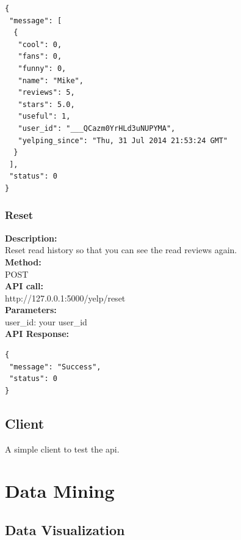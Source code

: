 \documentclass[12pt]{article}
\begin{document}
\begin{singlespacing}
\begin{lstlisting}
{
 "message": [
  {
   "cool": 0,
   "fans": 0,
   "funny": 0,
   "name": "Mike",
   "reviews": 5,
   "stars": 5.0,
   "useful": 1,
   "user_id": "___QCazm0YrHLd3uNUPYMA",
   "yelping_since": "Thu, 31 Jul 2014 21:53:24 GMT"
  }
 ],
 "status": 0
}
\end{lstlisting}
\end{singlespacing}

\subsubsection{Reset}
\textbf{Description:}\\
Reset read history so that you can see the read reviews again.\\
\textbf{Method:}\\
POST\\
\textbf{API call:}\\ 
http://127.0.0.1:5000/yelp/reset\\
\textbf{Parameters:}\\
user\_id: your user\_id\\
\textbf{API Response:}

\begin{singlespacing}
\begin{lstlisting}
{
 "message": "Success",
 "status": 0
}
\end{lstlisting}
\end{singlespacing}

\subsection{Client}
A simple client to test the api.

\section{Data Mining}\label{section-datamining}
\subsection{Data Visualization}
\end{document}
